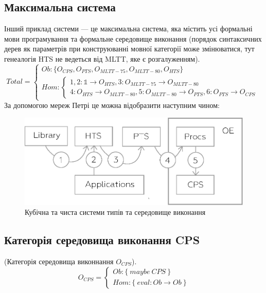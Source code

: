\newpage
\subsection{Максимальна система}
Інший приклад системи --- це максимальна система, яка містить усі формальні
мови програмування та формальне середовище виконання (порядок синтаксичних дерев
як параметрів при конструюванні мовної категорії може змінюватися, тут
генеалогія HTS не ведеться від MLTT, яке є розгалуженням).
\begin{equation}
Total =
\begin{cases}
Ob: \{ O_{CPS}, O_{PTS}, O_{MLTT-75}, O_{MLTT-80}, O_{HTS} \} \\
Hom: \begin{cases}
1,2: \mathbb{1} \rightarrow O_{HTS}, 3: O_{MLTT-75} \rightarrow O_{MLTT-80} \\
4: O_{HTS} \rightarrow O_{MLTT-80}, 5: O_{MLTT-80} \rightarrow O_{PTS}, 6: O_{PTS} \rightarrow O_{CPS}
\end{cases}
\end{cases}
\end{equation}
За допомогою мереж Петрі це можна відобразити наступним чином:
\begin{center}
\begin{figure}[ht]
  \centerline{\includegraphics[scale=0.6]{higher.eps}}
  \caption{Кубічна та чиста системи типів та середовище виконання}
\end{figure}
\end{center}


\newpage
\subsection{Категорія середовища виконання CPS}
\begin{definition} (Категорія середовища виконнання $O_{CPS}$).
$$
O_{CPS} =
\begin{cases}
Ob: \{\ maybe\ CPS\ \} \\
Hom: \{\ eval: Ob \rightarrow Ob\ \}
\end{cases}
$$
\end{definition}

